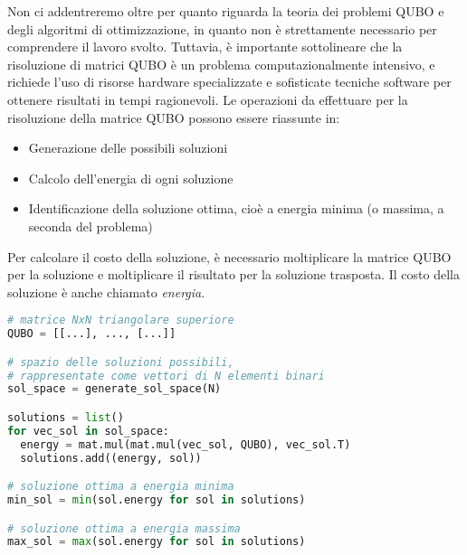 Non ci addentreremo oltre per quanto riguarda la teoria dei problemi \gls{QUBO} e degli algoritmi di ottimizzazione, in quanto non è strettamente necessario per comprendere il lavoro svolto. Tuttavia, è importante sottolineare che la risoluzione di matrici \gls{QUBO} è un problema computazionalmente intensivo, e richiede l'uso di risorse hardware specializzate e sofisticate tecniche software per ottenere risultati in tempi ragionevoli. Le operazioni da effettuare per la risoluzione della matrice \gls{QUBO} possono essere riassunte in:

\begin{itemize}
    \item Generazione delle possibili soluzioni
    \item Calcolo dell'energia di ogni soluzione
    \item Identificazione della soluzione ottima, cioè a energia minima (o massima, a seconda del problema)
\end{itemize}

Per calcolare il costo della soluzione, è necessario moltiplicare la matrice \gls{QUBO} per la soluzione e moltiplicare il risultato per la soluzione trasposta. Il costo della soluzione è anche chiamato \textit{energia}.

\vspace{5mm}
\begin{lstlisting}[language=Python, caption=Pseudocodice per la risoluzione di una matrice QUBO, label=lis:qubo_sol]
# matrice NxN triangolare superiore
QUBO = [[...], ..., [...]]

# spazio delle soluzioni possibili,
# rappresentate come vettori di N elementi binari
sol_space = generate_sol_space(N)

solutions = list()
for vec_sol in sol_space:
  energy = mat.mul(mat.mul(vec_sol, QUBO), vec_sol.T)
  solutions.add((energy, sol))

# soluzione ottima a energia minima
min_sol = min(sol.energy for sol in solutions)

# soluzione ottima a energia massima
max_sol = max(sol.energy for sol in solutions)
\end{lstlisting}
\vspace{5mm}

